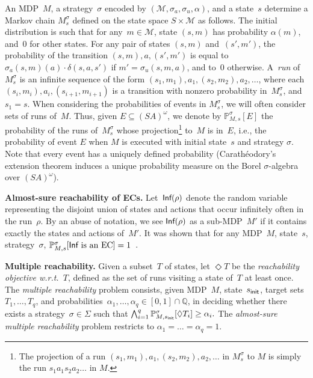 \documentclass{llncs}
\newcommand{\initState}{\ensuremath{s_{{\sf init}}} }
\newcommand*{\pr}{\mathbb{P}}
\newcommand{\Inf}{\textrm{\sf Inf}}
\newcommand{\queries}{\ensuremath{q} }
\newcommand{\rat}{\ensuremath{\mathbb{Q}} }
\newcommand{\strats}{\ensuremath{\Sigma} }
\newcommand\calM{\ensuremath{\mathcal{M}}}
\begin{document}
An MDP~$M$, a strategy~$\sigma$ encoded by $(\calM,\sigma_a,\sigma_u,\alpha)$, and a state~$s$ determine a
Markov chain $M_s^\sigma$ defined on the state space $S\times \calM$ as follows.
The initial distribution is such that for any~$m \in \calM$,
state $(s,m)$ has probability $\alpha(m)$, and~$0$ for other states. For any pair of states
$(s,m)$ and~$(s',m')$, the probability of the transition $(s,m),a,(s',m')$ is
equal to $\sigma_a(s,m)(a) \cdot \delta(s,a,s')$
if $m' = \sigma_u(s,m,a)$, and to~$0$ otherwise.
A~\emph{run} of~$M_s^\sigma$ is an infinite sequence of the form
$(s_1,m_1),a_1,(s_2,m_2),a_2,\ldots$, where each
$(s_i,m_i),a_i,(s_{i+1},m_{i+1})$ is a transition with nonzero probability
in~$M_s^\sigma$, and~$s_1=s$. 
When considering the probabilities of events in $M_s^\sigma$, we
will often consider sets of runs of~$M$. Thus, given $E \subseteq
(SA)^\omega$, we denote by $\pr_{M,s}^\sigma[E]$ the probability of the runs 
of~$M_s^\sigma$ whose projection\footnote{The projection of a run
$(s_1,m_1),a_1,(s_2,m_2),a_2,\ldots$ in $M_s^\sigma$ to $M$ is simply the run $s_{1}a_{1}s_{2}a_{2}\ldots{}$ in $M$.} to~$M$ is in~$E$, i.e., the probability of event $E$ when $M$ is executed with initial state~$s$ and strategy $\sigma$. Note that every event has a uniquely defined probability \cite{vardi_FOCS85} (Carath\'eodory's extension theorem induces a unique probability measure on the Borel $\sigma$-algebra over $(SA)^\omega$).


\smallskip\noindent\textbf{Almost-sure reachability of ECs.} Let~$\Inf(\rho)$ denote the random variable representing the disjoint union of states and actions that occur
infinitely often in the run~$\rho$. By an abuse of notation,
we see $\Inf(\rho)$ as a sub-MDP~$M'$ if it contains
exactly the states and actions of~$M'$. 
It was shown that for any MDP~$M$, state~$s$, strategy~$\sigma$,
${\pr_{M,s}^\sigma[\Inf \text{ is an EC}]=1}$~\cite{DeAlfaro-phd97}.



\smallskip\noindent\textbf{Multiple reachability.} Given a subset~$T$ of states,
let $\Diamond T$ be the \emph{reachability objective w.r.t.~$T$}, defined as 
the set of runs visiting a state of~$T$ at least once.
The \emph{multiple reachability} problem consists, given MDP~$M$, state~$\initState$, target sets
$T_1,\ldots,T_{\queries}$, and probabilities~$\alpha_1,\ldots,\alpha_{\queries} \in [0,1] \cap \rat$, 
in deciding whether there exists a strategy~$\sigma \in \strats$
such that
$\bigwedge_{i = 1}^{q} \pr_{M,\initState}^\sigma[\Diamond T_i]\geq \alpha_i.$
The \emph{almost-sure multiple reachability} problem restricts to $\alpha_1=\ldots=\alpha_{\queries} = 1$.
\end{document}
